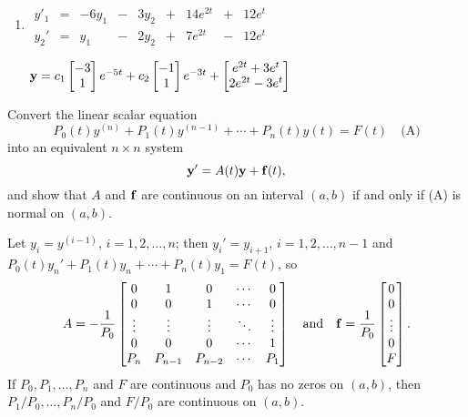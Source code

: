 \documentclass{ximera}
\begin{document}
\begin{problem}
\begin{enumerate}
\item %
 $\begin{array}{ccccccccc}
 y'_1&=&-6y_1&-&3y_2&+&14e^{2t}&+&12e^t \\
y_2'&=&y_1&-&2y_2&+&7e^{2t}&-&12e^t\end{array}$

${\bf y}=c_1\begin{bmatrix}-3\\1\end{bmatrix}e^{-5t}+c_2\begin{bmatrix}-1\\1\end{bmatrix}e^{-3t}+
\begin{bmatrix}e^{2t}+3e^t\\2e^{2t}-3e^t\end{bmatrix}$

\end{enumerate}
\end{problem}

\begin{problem}\label{exer:10.2.6}
Convert the linear scalar equation
$$
P_0(t)y^{(n)}+P_1(t)y^{(n-1)}+\cdots+P_n(t)y(t)=F(t)
\quad\text{(A)}
$$
into an equivalent $n\times n$ system
$$
{\bf y'}=A(t){\bf y}+{\bf f}(t),
$$
and show that $A$ and ${\bf f}$ are continuous on an interval
$(a,b)$ if and only if (A) is normal on $(a,b)$.

\begin{solution}
    Let  $y_i=y^{(i-1)}$, $i=1,2,\dots,n$; then $y_i'=y_{i+1}$,
$i=1,2,\dots,n-1$ and $P_0(t)y_n'+P_1(t)y_n+\cdots+P_n(t)y_1=F(t)$, so
$$A=-\frac{1}{ P_0}
\begin{bmatrix}
0&1&0&\cdots&0\\
0&0&1&\cdots&0\\
\vdots&\vdots&\vdots&\ddots&\vdots\\
0&0&0&\cdots&1\\
P_n&P_{n-1}&P_{n-2}&\cdots&P_1
\end{bmatrix}\quad
\mbox{and}\quad
{\bf f}=\frac{1}{ P_0}
\begin{bmatrix}
0\\ 0\\\vdots\\0\\F
\end{bmatrix}.
$$
If $P_0,P_1,\dots,P_n$ and $F$ are continuous and $P_0$
has no zeros on $(a,b)$, then $P_1/P_0,\dots,P_n/P_0$  and
$F/P_0$ are continuous on $(a,b)$.
\end{solution}

\end{problem}
\end{document}
